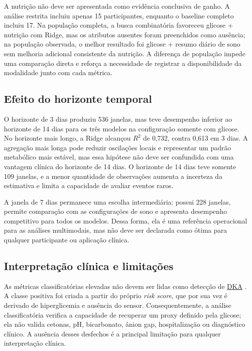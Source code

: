 \documentclass[12pt,a4paper]{article}
\DeclareRobustCommand{\sigla}[1]{%
    \texorpdfstring{\hyperlink{sigla:#1}{#1}}{#1}%
}
\begin{document}
A nutrição não deve ser apresentada como evidência conclusiva de ganho. A
análise restrita incluiu apenas 15 participantes, enquanto o baseline completo
incluiu 17. Na população completa, a busca combinatória favoreceu glicose +
nutrição com Ridge, mas os atributos ausentes foram preenchidos como ausência;
na população observada, o melhor resultado foi glicose + resumo diário de sono
sem melhoria adicional consistente da nutrição. A diferença de população
impede uma comparação direta e reforça a necessidade de registrar a
disponibilidade da modalidade junto com cada métrica.

\subsection{Efeito do horizonte temporal}

O horizonte de 3 dias produziu 536 janelas, mas teve desempenho inferior ao
horizonte de 14 dias para os três modelos na configuração somente com glicose.
No horizonte mais longo, a Ridge alcançou $R^2$ de 0,732, contra 0,613 em
3 dias. A agregação mais longa pode reduzir oscilações locais e representar
um padrão metabólico mais estável, mas essa hipótese não deve ser confundida
com uma vantagem clínica do horizonte de 14 dias. O horizonte de 14 dias teve
somente 109 janelas, e a menor quantidade de observações aumenta a incerteza
da estimativa e limita a capacidade de avaliar eventos raros.

A janela de 7 dias permanece uma escolha intermediária: possui 228 janelas,
permite comparação com as configurações de sono e apresenta desempenho
competitivo para todos os modelos. Dessa forma, ela é uma referência
operacional para as análises multimodais, mas não deve ser declarada como
ótima para qualquer participante ou aplicação clínica.

\subsection{Interpretação clínica e limitações}

As métricas classificatórias elevadas não devem ser lidas como detecção de
\sigla{DKA}. A classe positiva foi criada a partir do próprio \textit{risk
score}, que por sua vez é derivado de hiperglicemia e ausência do sensor.
Consequentemente, a análise classificatória verifica a capacidade de recuperar
um proxy definido pela glicose; ela não valida cetonas, pH, bicarbonato,
ânion gap, hospitalização ou diagnóstico clínico. A ausência desses desfechos
é a principal limitação para qualquer interpretação clínica.
\end{document}
